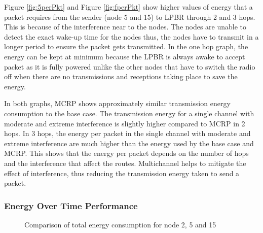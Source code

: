 Figure \ref{fig:5perPkt} and Figure \ref{fig:fperPkt} show higher values of energy that a packet requires from the sender (node 5 and 15) to LPBR through 2 and 3 hops. 
This is because of the interference near to the nodes. The nodes are unable to detect the exact wake-up time for the nodes thus, the nodes have to transmit in a longer period to ensure the packet gets transmitted. In the one hop graph, the energy can be kept at minimum because the LPBR is always awake to accept packet as it is fully powered unlike the other nodes that have to switch the radio off when there are no transmissions and receptions taking place to save the energy.

In both graphs, MCRP shows approximately similar transmission energy consumption to the base case. The transmission energy for a single channel with moderate and extreme interference is slightly higher compared to MCRP in 2 hops. In 3 hops, the energy per packet in the single channel with moderate and extreme interference are much higher than the energy used by the base case and MCRP. This shows that the energy per packet depends on the number of hops and the interference that affect the routes. Multichannel helps to mitigate the effect of interference, thus reducing the transmission energy taken to send a packet.

\subsubsection{Energy Over Time Performance}

\begin{figure}
\centering
{}      
\caption{Comparison of total energy consumption for node 2, 5 and 15}
\label{fig:energyTotal}
\end{figure}

